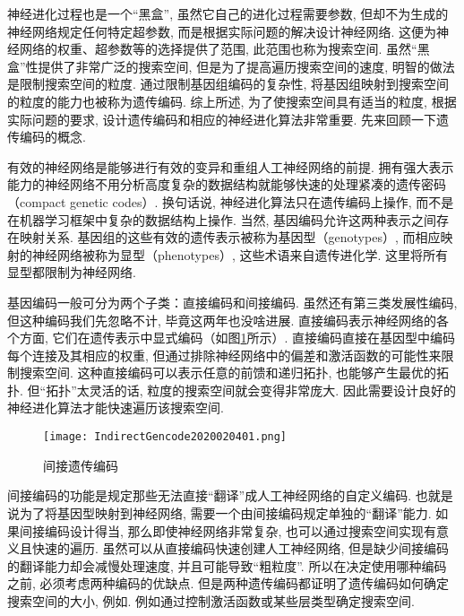 \begin{remark}
神经进化过程也是一个“黑盒”, 虽然它自己的进化过程需要参数, 但却不为生成的神经网络规定任何特定超参数, 而是根据实际问题的解决设计神经网络. 这便为神经网络的权重、超参数等的选择提供了范围, 此范围也称为搜索空间. 虽然“黑盒”性提供了非常广泛的搜索空间, 但是为了提高遍历搜索空间的速度, 明智的做法是限制搜索空间的粒度. 通过限制基因组编码的复杂性, 将基因组映射到搜索空间的粒度的能力也被称为遗传编码. 综上所述, 为了使搜索空间具有适当的粒度, 根据实际问题的要求, 设计遗传编码和相应的神经进化算法非常重要. 先来回顾一下遗传编码的概念.

有效的神经网络是能够进行有效的变异和重组人工神经网络的前提. 拥有强大表示能力的神经网络不用分析高度复杂的数据结构就能够快速的处理紧凑的遗传密码（compact genetic codes）.
换句话说, 神经进化算法只在遗传编码上操作, 而不是在机器学习框架中复杂的数据结构上操作. 当然, 基因编码允许这两种表示之间存在映射关系. 基因组的这些有效的遗传表示被称为基因型（genotypes）, 而相应映射的神经网络被称为显型（phenotypes）, 这些术语来自遗传进化学. 这里将所有显型都限制为神经网络.

基因编码一般可分为两个子类：直接编码和间接编码. 虽然还有第三类发展性编码, 但这种编码我们先忽略不计, 毕竟这两年也没啥进展. 直接编码表示神经网络的各个方面, 它们在遗传表示中显式编码（如图\ref{IndirectGencode2020020401}所示）. 直接编码直接在基因型中编码每个连接及其相应的权重, 但通过排除神经网络中的偏差和激活函数的可能性来限制搜索空间.
这种直接编码可以表示任意的前馈和递归拓扑, 也能够产生最优的拓扑. 但“拓扑”太灵活的话, 粒度的搜索空间就会变得非常庞大. 因此需要设计良好的神经进化算法才能快速遍历该搜索空间.
\begin{figure}[H]
\centering
\texttt{[image: IndirectGencode2020020401.png]}
\caption{间接遗传编码}
\label{IndirectGencode2020020401}
\end{figure}

间接编码的功能是规定那些无法直接“翻译”成人工神经网络的自定义编码. 也就是说为了将基因型映射到神经网络, 需要一个由间接编码规定单独的“翻译”能力. 如果间接编码设计得当, 那么即使神经网络非常复杂, 也可以通过搜索空间实现有意义且快速的遍历.
虽然可以从直接编码快速创建人工神经网络, 但是缺少间接编码的翻译能力却会减慢处理速度, 并且可能导致“粗粒度”. 所以在决定使用哪种编码之前, 必须考虑两种编码的优缺点.
但是两种遗传编码都证明了遗传编码如何确定搜索空间的大小, 例如. 例如通过控制激活函数或某些层类型确定搜索空间.
\end{remark}


